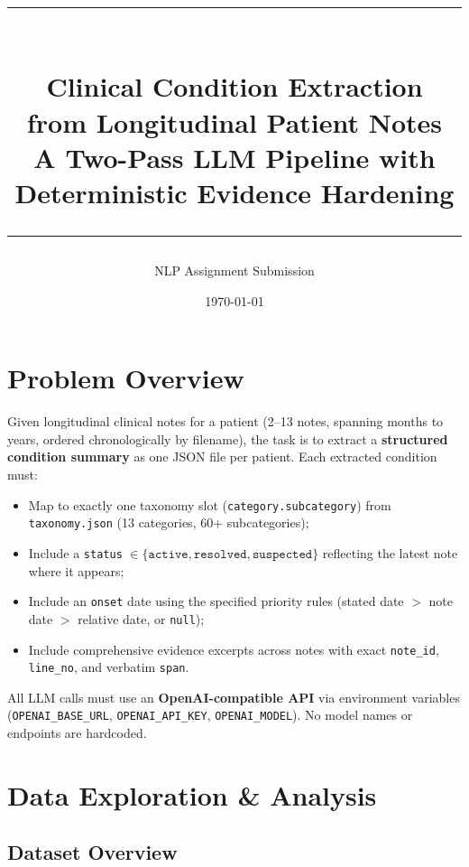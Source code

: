 \documentclass[11pt, a4paper]{article}
\title{%
  \vspace{-1cm}
  {\color{accentblue}\rule{\textwidth}{1.2pt}}\\[0.6em]
  {\Huge\bfseries Clinical Condition Extraction\\[0.2em] from Longitudinal Patient Notes}\\[0.5em]
  {\large\color{gray} A Two-Pass LLM Pipeline with Deterministic Evidence Hardening}\\[0.3em]
  {\color{accentblue}\rule{\textwidth}{1.2pt}}
}
\author{NLP Assignment Submission}
\date{\today}
\begin{document}
\maketitle
\thispagestyle{fancy}

\section{Problem Overview}

Given longitudinal clinical notes for a patient (2--13 notes, spanning months to years, ordered chronologically by filename), the task is to extract a \textbf{structured condition summary} as one JSON file per patient. Each extracted condition must:

\begin{itemize}[leftmargin=1.2em, itemsep=2pt]
  \item Map to exactly one taxonomy slot (\texttt{category.subcategory}) from \texttt{taxonomy.json} (13 categories, 60+ subcategories);
  \item Include a \texttt{status} $\in \{\texttt{active}, \texttt{resolved}, \texttt{suspected}\}$ reflecting the latest note where it appears;
  \item Include an \texttt{onset} date using the specified priority rules (stated date $>$ note date $>$ relative date, or \texttt{null});
  \item Include comprehensive evidence excerpts across notes with exact \texttt{note\_id}, \texttt{line\_no}, and verbatim \texttt{span}.
\end{itemize}

\noindent All LLM calls must use an \textbf{OpenAI-compatible API} via environment variables (\texttt{OPENAI\_BASE\_URL}, \texttt{OPENAI\_API\_KEY}, \texttt{OPENAI\_MODEL}). No model names or endpoints are hardcoded.

\section{Data Exploration \& Analysis}

\subsection{Dataset Overview}
\end{document}
